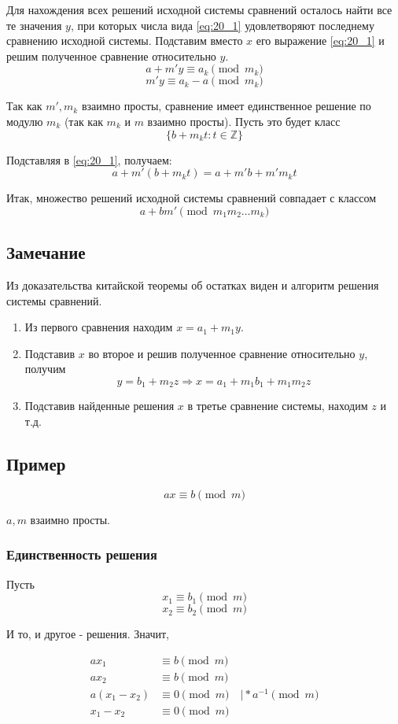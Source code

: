 \documentclass{article}
\begin{document}
Для нахождения всех решений исходной системы сравнений осталось найти все те значения $y$, при которых числа вида \eqref{eq:20_1} удовлетворяют последнему сравнению исходной системы. Подставим вместо $x$ его выражение \eqref{eq:20_1} и решим полученное сравнение относительно $y$.
\[a + m'y \equiv a_k \pmod{m_k}\]
\[m'y \equiv a_k - a \pmod{m_k}\]

Так как $m', m_k$ взаимно просты, сравнение имеет единственное решение по модулю $m_k$ (так как $m_k$ и $m$ взаимно просты). Пусть это будет класс
\[\{b + m_k t : t \in \mathbb Z \} \]

Подставляя в \eqref{eq:20_1}, получаем:
\[a + m'(b + m_k t) = a + m'b + m' m_k t\]

Итак, множество решений исходной системы сравнений совпадает с классом \[a + b m' \pmod{m_1 m_2 \dots m_k}\]

\subsection{Замечание}
Из доказательства китайской теоремы об остатках виден и алгоритм решения системы сравнений.
\begin{enumerate}
\item Из первого сравнения находим $x = a_1 + m_1 y$.
\item Подставив $x$ во второе и решив полученное сравнение относительно $y$, получим
\[y = b_1 + m_2z \Rightarrow x = a_1 + m_1b_1 + m_1m_2z\]
\item Подставив найденные решения $x$ в третье сравнение системы, находим $z$ и т.д.
\end{enumerate}

\subsection{Пример}
\[ax \equiv b \pmod{m}\]

$a, m$ взаимно просты.

\subsubsection*{Единственность решения}
Пусть
\[x_1 \equiv b_1 \pmod{m} \]
\[x_2 \equiv b_2 \pmod{m} \]

И то, и другое - решения. Значит,

\begin{align*}
ax_1 &\equiv b \pmod{m} \\
ax_2 &\equiv b \pmod{m} \\
a(x_1 - x_2) &\equiv 0 \pmod{m} \quad \vert * a^{-1} \pmod{m} \\
x_1 - x_2 &\equiv 0 \pmod{m} \\
\end{align*}
\end{document}
